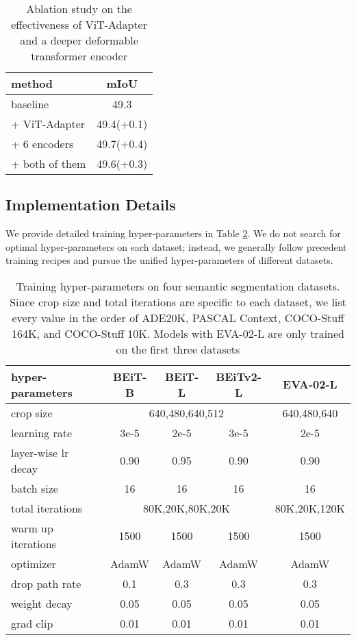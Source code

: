 \documentclass{article} \usepackage{iclr2024_conference,times}
\begin{document}
\begin{table}[h]
\small
\caption{Ablation study on the effectiveness of ViT-Adapter and a deeper deformable transformer encoder}
\begin{center}
\label{tab:13}
\begin{tabular}{lc}
\toprule
method  &mIoU \\\midrule
baseline  &49.3\\
+ ViT-Adapter  &49.4(+0.1) \\
+ 6 encoders  &49.7(+0.4) \\
+ both of them  &49.6(+0.3) \\
\bottomrule
\end{tabular}
\end{center}
\end{table}

\fi
\subsection{Implementation Details}

We provide detailed training hyper-parameters in Table \ref{tab:9}. We do not search for optimal hyper-parameters on each dataset; instead, we generally follow precedent training recipes and pursue the unified hyper-parameters of different datasets.
\begin{table}[h]
\caption{Training hyper-parameters on four semantic segmentation datasets. Since crop size and total iterations are specific to each dataset, we list every value in the order of ADE20K, PASCAL Context, COCO-Stuff 164K, and COCO-Stuff 10K. Models with EVA-02-L are only trained on the first three datasets}
\begin{center}
\label{tab:9}
\begin{tabular}{l|ccc|c}
\toprule
hyper-parameters & BEiT-B & BEiT-L & BEiTv2-L  &EVA-02-L \\\midrule

crop size &\multicolumn{3}{c|}{640,480,640,512} &640,480,640 \\
learning rate &3e-5 &2e-5  &3e-5 &2e-5 \\
layer-wise lr decay &0.90 &0.95 &0.90 &0.90 \\
batch size &16 &16 &16 &16\\
total iterations&\multicolumn{3}{c|}{80K,20K,80K,20K} & 80K,20K,120K\\
warm up iterations&1500 &1500 &1500 &1500 \\
optimizer& AdamW & AdamW & AdamW & AdamW\\
drop path rate &0.1 &0.3 &0.3 &0.3 \\
weight decay &0.05 &0.05 &0.05 &0.05 \\
grad clip &0.01 &0.01 &0.01 &0.01 \\
\bottomrule
\end{tabular}
\end{center}
\end{table}
\end{document}
